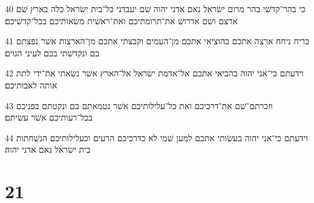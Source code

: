 \par 40 כי בהר־קדשׁי בהר מרום ישׂראל נאם אדני יהוה שׁם יעבדני כל־בית ישׂראל כלה בארץ שׁם ארצם ושׁם אדרושׁ את־תרומתיכם ואת־ראשׁית משׂאותיכם בכל־קדשׁיכם׃
\par 41 בריח ניחח ארצה אתכם בהוציאי אתכם מן־העמים וקבצתי אתכם מן־הארצות אשׁר נפצתם בם ונקדשׁתי בכם לעיני הגוים׃
\par 42 וידעתם כי־אני יהוה בהביאי אתכם אל־אדמת ישׂראל אל־הארץ אשׁר נשׂאתי את־ידי לתת אותה לאבותיכם׃
\par 43 וזכרתם־שׁם את־דרכיכם ואת כל־עלילותיכם אשׁר נטמאתם בם ונקטתם בפניכם בכל־רעותיכם אשׁר עשׂיתם׃
\par 44 וידעתם כי־אני יהוה בעשׂותי אתכם למען שׁמי לא כדרכיכם הרעים וכעלילותיכם הנשׁחתות בית ישׂראל נאם אדני יהוה׃

\chapter{21}

